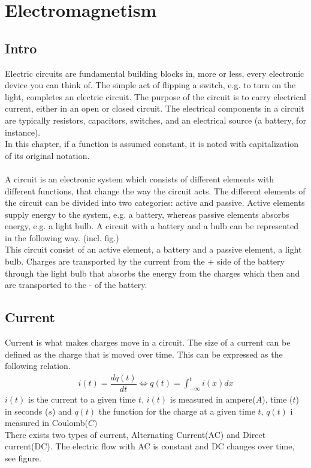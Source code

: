 \chapter{Electromagnetism}
\section{Intro}
Electric circuits are fundamental building blocks in, more or less, every electronic device you can think of. The simple act of flipping a switch, e.g. to turn on the light, completes an electric circuit. The purpose of the circuit is to carry electrical current, either in an open or closed circuit. The electrical components in a circuit are typically resistors, capacitors,  switches, and an electrical source (a battery, for instance).
\\ 
In this chapter, if a function is assumed constant, it is noted with capitalization of its original notation. 
\\ 
\\
A circuit is an electronic system which consists of different elements with different functions, that change the way the circuit acts. The different elements of the circuit can be divided into two categories: active and passive. Active elements supply energy to the system, e.g. a battery, whereas passive elements absorbs energy, e.g. a light bulb. A circuit with a battery and a bulb can be represented in the following way. (incl. fig.)\\ This circuit consist of an active element, a battery and a passive element, a light bulb. Charges are transported by the current from the + side of the battery through the light bulb that absorbs the energy from the charges which then and are transported to the - of the battery.
\\
\section{Current}
Current is what makes charges move in a circuit. The size of a current can be defined as the charge that is moved over time. This can be expressed as the following relation.
\begin{align}
i(t)=\dfrac{dq(t)}{dt} \Leftrightarrow q(t)=\int_{-\infty}^{t}i(x)dx
\end{align}
$i(t)$ is the current to a given time $t$, $i(t)$ is measured in ampere($A$), time ($t$) in seconds ($s$) and $q(t)$ the function for the charge at a given time $t$, $q(t)$ i measured in Coulomb($C)$
\\
There exists two types of current, Alternating Current(AC) and Direct current(DC). The electric flow with AC is constant and DC changes over time, see figure.
\\
